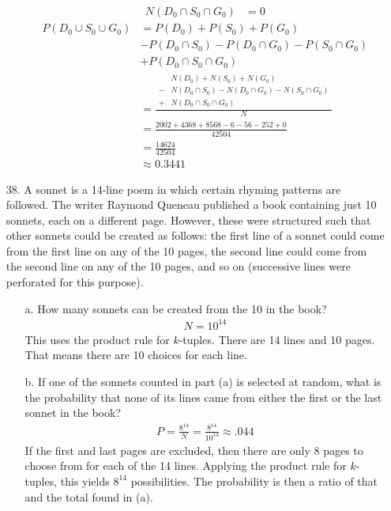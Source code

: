 \documentclass[letterpaper,12pt]{article}
\begin{document}
\begin{enumerate}
\begin{enumerate}
\begin{align*}
          N(D_0 \cap S_0 \cap G_0) &= 0
        \end{align*}
        \begin{align*}
          P(D_0 \cup S_0 \cup G_0) &= P(D_0) + P(S_0) + P(G_0) \\
          &- P(D_0 \cap S_0) - P(D_0 \cap G_0) - P(S_0 \cap G_0) \\
          &+ P(D_0 \cap S_0 \cap G_0) \\
          &= \frac{\begin{aligned}
            &N(D_0) + N(S_0) + N(G_0) \\
            - &N(D_0 \cap S_0) - N(D_0 \cap G_0) - N(S_0 \cap G_0) \\
            + &N(D_0 \cap S_0 \cap G_0)
          \end{aligned}}{N} \\
          &= \frac{2002 + 4368 + 8568 - 6 - 56 - 252 + 0}{42504} \\
          &= \frac{14624}{42504} \\
          &\approx 0.3441
        \end{align*}
    \end{enumerate}
  \item[38.]
    A sonnet is a 14-line poem in which certain rhyming patterns are followed. The writer Raymond Queneau published a book containing just 10 sonnets, each on a different page. However, these were structured such that other sonnets could be created as follows: the first line of a sonnet could come from the first line on any of the 10 pages, the second line could come from the second line on any of the 10 pages, and so on (successive lines were perforated for this purpose).
    \begin{enumerate}
        \item[a.]
          How many sonnets can be created from the 10 in the book?
          \begin{align*}
            N = 10^{14}
          \end{align*}
          This uses the product rule for $k$-tuples. There are 14 lines and 10 pages. That means there are 10 choices for each line.
        \item[b.]
          If one of the sonnets counted in part (a) is selected at random, what is the probability that none of its lines came from either the first or the last sonnet in the book?
          \begin{align*}
            P = \frac{8^{14}}{N} = \frac{8^{14}}{10^{14}} \approx .044
          \end{align*}
          If the first and last pages are excluded, then there are only 8 pages to choose from for each of the 14 lines. Applying the product rule for $k$-tuples, this yields $8^{14}$ possibilities. The probability is then a ratio of that and the total found in (a).
      \end{enumerate}
\end{enumerate}
\end{document}
